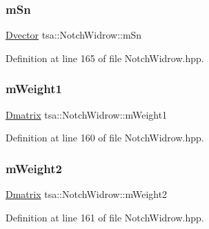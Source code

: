 \subsubsection{\texorpdfstring{m\+Sn}{mSn}}
{\footnotesize\ttfamily \hyperlink{namespacetsa_a8900fb03d849baf447a1a0efe2561fb2}{Dvector} tsa\+::\+Notch\+Widrow\+::m\+Sn\hspace{0.3cm}{\ttfamily [private]}}



Definition at line 165 of file Notch\+Widrow.\+hpp.

\mbox{\label{classtsa_1_1_notch_widrow_a73d8df3ec7105a4f481edc807123df5c}} 
\subsubsection{\texorpdfstring{m\+Weight1}{mWeight1}}
{\footnotesize\ttfamily \hyperlink{namespacetsa_ad260cd21c1891c4ed391fe788569aba4}{Dmatrix} tsa\+::\+Notch\+Widrow\+::m\+Weight1\hspace{0.3cm}{\ttfamily [private]}}



Definition at line 160 of file Notch\+Widrow.\+hpp.

\mbox{\label{classtsa_1_1_notch_widrow_a942bc010a02f09c124589a5f467b9100}} 
\subsubsection{\texorpdfstring{m\+Weight2}{mWeight2}}
{\footnotesize\ttfamily \hyperlink{namespacetsa_ad260cd21c1891c4ed391fe788569aba4}{Dmatrix} tsa\+::\+Notch\+Widrow\+::m\+Weight2\hspace{0.3cm}{\ttfamily [private]}}



Definition at line 161 of file Notch\+Widrow.\+hpp.

\mbox{\label{classtsa_1_1_notch_widrow_af4771f4a7d4b59bb804ee77679e13284}} 
